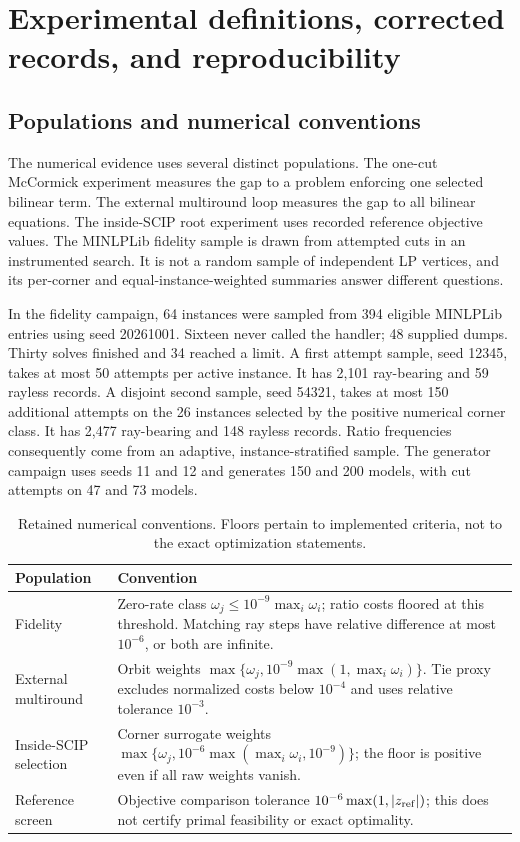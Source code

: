 \section{Experimental definitions, corrected records, and reproducibility}
\label{exp:protocols}

\subsection{Populations and numerical conventions}
\label{exp:populations}

The numerical evidence uses several distinct populations. The one-cut
McCormick experiment measures the gap to a problem enforcing one selected
bilinear term. The external multiround loop measures the gap to all
bilinear equations. The inside-SCIP root experiment uses recorded
reference objective values. The MINLPLib fidelity sample is drawn from
attempted cuts in an instrumented search. It is not a random sample of
independent LP vertices, and its per-corner and equal-instance-weighted
summaries answer different questions.

In the fidelity campaign, 64 instances were sampled from 394 eligible
MINLPLib entries using seed 20261001. Sixteen never called the handler;
48 supplied dumps. Thirty solves finished and 34 reached a limit.
A first attempt sample, seed 12345, takes at most 50 attempts per active
instance. It has 2,101 ray-bearing and 59 rayless records. A disjoint
second sample, seed 54321, takes at most 150 additional attempts on the
26 instances selected by the positive numerical corner class. It has
2,477 ray-bearing and 148 rayless records. Ratio frequencies consequently
come from an adaptive, instance-stratified sample. The generator campaign
uses seeds 11 and 12 and generates 150 and 200 models, with cut attempts
on 47 and 73 models.

\begin{table}[h]
\centering
\caption{Retained numerical conventions. Floors pertain to implemented
criteria, not to the exact optimization statements.}
\label{exp:thresholds}
\begin{tabular}{@{}p{}p{}@{}}
\toprule
Population & Convention \\
\midrule
Fidelity & Zero-rate class $\omega_j\le 10^{-9}\max_i\omega_i$;
ratio costs floored at this threshold. Matching ray steps have relative
difference at most $10^{-6}$, or both are infinite. \\
External multiround & Orbit weights
$\max\{\omega_j, 10^{-9}\max(1,\max_i\omega_i)\}$.
Tie proxy excludes normalized costs below $10^{-4}$ and uses relative
tolerance $10^{-3}$. \\
Inside-SCIP selection & Corner surrogate weights
$\max\{\omega_j, 10^{-6}\max(\max_i\omega_i, 10^{-9})\}$;
the floor is positive even if all raw weights vanish. \\
Reference screen & Objective comparison tolerance
$10^{-6}\max(1,|z_{\rm ref}|)$; this does not certify primal feasibility
or exact optimality. \\
\bottomrule
\end{tabular}
\end{table}

